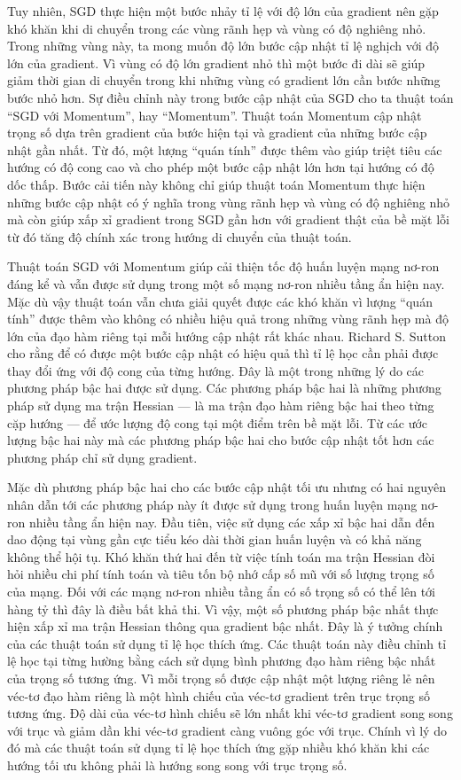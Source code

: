 Tuy nhiên, SGD thực hiện một bước nhảy tỉ lệ với độ lớn của gradient nên gặp khó khăn khi di chuyển trong các vùng rãnh hẹp và vùng có độ nghiêng nhỏ. Trong những vùng này, ta mong muốn độ lớn bước cập nhật tỉ lệ nghịch với độ lớn của gradient. Vì vùng có độ lớn gradient nhỏ thì một bước đi dài sẽ giúp giảm thời gian di chuyển trong khi những vùng có gradient lớn cần bước những bước nhỏ hơn. Sự điều chỉnh này trong bước cập nhật của SGD cho ta thuật toán ``SGD với Momentum'', hay ``Momentum''. Thuật toán Momentum cập nhật trọng số dựa trên gradient của bước hiện tại và gradient của những bước cập nhật gần nhất. Từ đó, một lượng ``quán tính'' được thêm vào giúp triệt tiêu các hướng có độ cong cao và cho phép một bước cập nhật lớn hơn tại hướng có độ dốc thấp. Bước cải tiến này không chỉ giúp thuật toán Momentum thực hiện những bước cập nhật có ý nghĩa trong vùng rãnh hẹp và vùng có độ nghiêng nhỏ mà còn giúp xấp xỉ gradient trong SGD gần hơn với gradient thật của bề mặt lỗi từ đó tăng độ chính xác trong hướng di chuyển của thuật toán.

Thuật toán SGD với Momentum giúp cải thiện tốc độ huấn luyện mạng nơ-ron đáng kể và vẫn được sử dụng trong một số mạng nơ-ron nhiều tầng ẩn hiện nay. Mặc dù vậy thuật toán vẫn chưa giải quyết được các khó khăn vì lượng ``quán tính'' được thêm vào không có nhiều hiệu quả trong những vùng rãnh hẹp mà độ lớn của đạo hàm riêng tại mỗi hướng cập nhật rất khác nhau. Richard S. Sutton cho rằng để có được một bước cập nhật có hiệu quả thì tỉ lệ học cần phải được thay đổi ứng với độ cong của từng hướng\cite{sutton1986two}. Đây là một trong những lý do các phương pháp bậc hai được sử dụng. Các phương pháp bậc hai là những phương pháp sử dụng ma trận Hessian — là ma trận đạo hàm riêng bậc hai theo từng cặp hướng — để ước lượng độ cong tại một điểm trên bề mặt lỗi. Từ các ước lượng bậc hai này mà các phương pháp bậc hai cho bước cập nhật tốt hơn các phương pháp chỉ sử dụng gradient.

Mặc dù phương pháp bậc hai cho các bước cập nhật tối ưu nhưng có hai nguyên nhân dẫn tới các phương pháp này ít được sử dụng trong huấn luyện mạng nơ-ron nhiều tầng ẩn hiện nay. Đầu tiên, việc sử dụng các xấp xỉ bậc hai dẫn đến dao động tại vùng gần cực tiểu kéo dài thời gian huấn luyện và có khả năng không thể hội tụ. Khó khăn thứ hai đến từ việc tính toán ma trận Hessian đòi hỏi nhiều chi phí tính toán và tiêu tốn bộ nhớ cấp số mũ với số lượng trọng số của mạng. Đối với các mạng nơ-ron nhiều tầng ẩn có số trọng số có thể lên tới hàng tỷ thì đây là điều bất khả thi. Vì vậy, một số phương pháp bậc nhất thực hiện xấp xỉ ma trận Hessian thông qua gradient bậc nhất. Đây là ý tưởng chính của các thuật toán sử dụng tỉ lệ học thích ứng. Các thuật toán này điều chỉnh tỉ lệ học tại từng hường bằng cách sử dụng bình phương đạo hàm riêng bậc nhất của trọng số tương ứng. Vì mỗi trọng số được cập nhật một lượng riêng lẻ nên véc-tơ đạo hàm riêng là một hình chiếu của véc-tơ gradient trên trục trọng số tương ứng. Độ dài của véc-tơ hình chiếu sẽ lớn nhất khi véc-tơ gradient song song với trục và giảm dần khi véc-tơ gradient càng vuông góc với trục. Chính vì lý do đó mà các thuật toán sử dụng tỉ lệ học thích ứng gặp nhiều khó khăn khi các hướng tối ưu không phải là hướng song song với trục trọng số.

